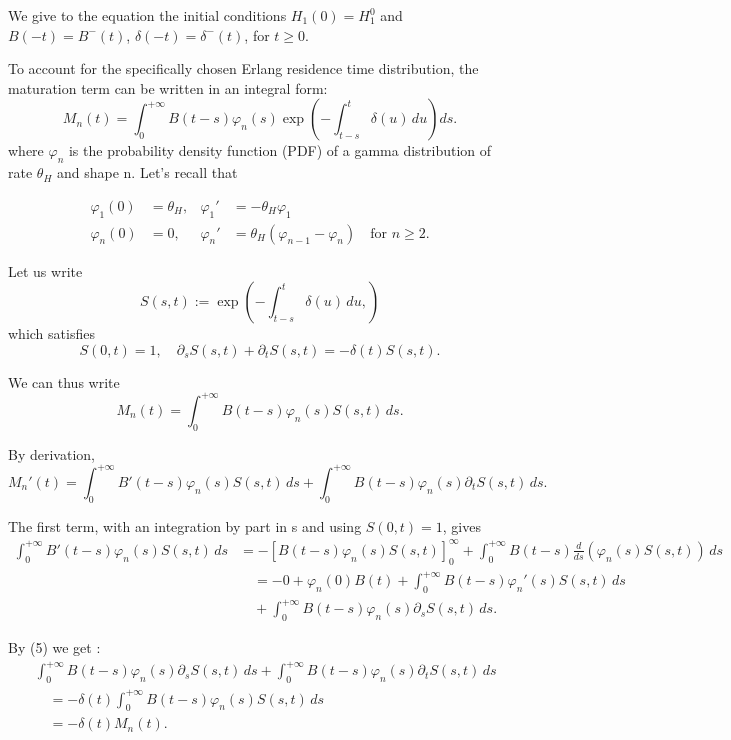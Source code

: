 \documentclass[12pt,a4paper,onecolumn]{article}
\begin{document}
We give to the equation the initial conditions $H_1(0) = H_1^0$ and $B(-t) = B^{-}(t)$, $\delta(-t) = \delta^{-}(t)$, for $t \geq 0$.

To account for the specifically chosen Erlang residence time distribution, the maturation term can be written in an integral form:
\begin{equation}
M_n(t) = \int_0^{+\infty} B(t-s)\varphi_n(s) \exp\left( -\int_{t-s}^{t} \delta(u) \, du \right) ds.
\end{equation}
where $\varphi_n$ is the probability density function (PDF) of a gamma distribution of rate $\theta_H$ and shape n. Let's recall that

\begin{align}
\varphi_1(0) &= \theta_H, & \varphi_1' &= -\theta_H \varphi_1 \\
\varphi_n(0) &= 0, & \varphi_n' &= \theta_H (\varphi_{n-1} - \varphi_n) \quad \text{for } n \geq 2.
\end{align}

Let us write 
\[
S(s, t) := \exp\left( -\int_{t-s}^{t} \delta(u) \, du, \right)
\]
which satisfies
\begin{equation}
S(0, t) = 1, \quad \partial_s S(s,t) + \partial_t S(s,t) = -\delta(t) S(s,t).
\end{equation}

We can thus write 
\[
M_n(t) = \int_0^{+\infty} B(t-s)\varphi_n(s)S(s,t) \, ds.
\]

By derivation,
\begin{equation}
M_n'(t) = \int_0^{+\infty} B'(t-s)\varphi_n(s)S(s,t) \, ds + \int_0^{+\infty} B(t-s)\varphi_n(s) \partial_t S(s,t) \, ds.
\end{equation}

The first term, with an integration by part in s and using $S(0,t) = 1$, gives
\begin{align*}
\int_0^{+\infty} B'(t-s)\varphi_n(s)S(s,t) \, ds &= -[B(t-s) \varphi_n(s) S(s,t) ]_{0}^{\infty} + \int_0^{+\infty} B(t-s)\frac{d}{ds}(\varphi_n(s)S(s,t)) \, ds \\
&\quad = -0 + \varphi_n(0) B(t) + \int_0^{+\infty} B(t-s)\varphi_n'(s) S(s,t) \, ds \\
&\quad + \int_0^{+\infty} B(t-s)\varphi_n(s) \partial_s S(s,t) \, ds.
\end{align*}

By (5) we get :
\begin{align*}
&\int_0^{+\infty} B(t-s)\varphi_n(s) \partial_s S(s,t) \, ds  + \int_0^{+\infty} B(t-s)\varphi_n(s) \partial_t S(s,t) \, ds \\
&\quad = - \delta(t) \int_0^{+\infty} B(t-s)\varphi_n(s) S(s,t)  \, ds \\
&\quad = - \delta(t) M_n(t).
\end{align*}
\end{document}
